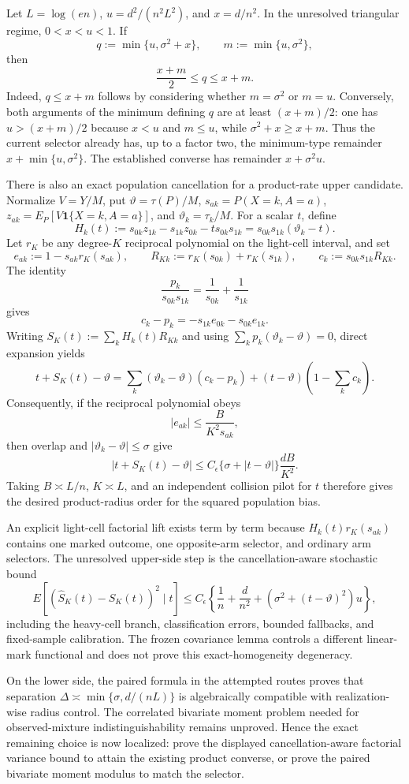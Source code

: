 Let \(L=\log(en)\), \(u=d^2/(n^2L^2)\), and \(x=d/n^2\).  In the unresolved triangular regime, \(0<x<u<1\).  If
\[
 q:=\min\{u,\sigma^2+x\},
 \qquad
 m:=\min\{u,\sigma^2\},
\]
then
\[
 \frac{x+m}{2}\le q\le x+m.
\]
Indeed, \(q\le x+m\) follows by considering whether \(m=\sigma^2\) or \(m=u\).  Conversely, both arguments of the minimum defining \(q\) are at least \((x+m)/2\): one has \(u>(x+m)/2\) because \(x<u\) and \(m\le u\), while \(\sigma^2+x\ge x+m\).  Thus the current selector already has, up to a factor two, the minimum-type remainder \(x+\min\{u,\sigma^2\}\).  The established converse has remainder \(x+\sigma^2u\).

There is also an exact population cancellation for a product-rate upper candidate.  Normalize \(V=Y/M\), put \(\vartheta=\tau(P)/M\), \(s_{ak}=P(X=k,A=a)\), \(z_{ak}=E_P[V\mathbf 1\{X=k,A=a\}]\), and \(\vartheta_k=\tau_k/M\).  For a scalar \(t\), define
\[
 H_k(t):=s_{0k}z_{1k}-s_{1k}z_{0k}-t s_{0k}s_{1k}
 =s_{0k}s_{1k}(\vartheta_k-t).
\]
Let \(r_K\) be any degree-\(K\) reciprocal polynomial on the light-cell interval, and set
\[
 e_{ak}:=1-s_{ak}r_K(s_{ak}),
 \qquad
 R_{Kk}:=r_K(s_{0k})+r_K(s_{1k}),
 \qquad
 c_k:=s_{0k}s_{1k}R_{Kk}.
\]
The identity
\[
 \frac{p_k}{s_{0k}s_{1k}}=\frac1{s_{0k}}+\frac1{s_{1k}}
\]
gives
\[
 c_k-p_k=-s_{1k}e_{0k}-s_{0k}e_{1k}.
\]
Writing \(S_K(t):=\sum_kH_k(t)R_{Kk}\) and using \(\sum_kp_k(\vartheta_k-\vartheta)=0\), direct expansion yields
\[
 t+S_K(t)-\vartheta
 =\sum_k(\vartheta_k-\vartheta)(c_k-p_k)
 +(t-\vartheta)\left(1-\sum_kc_k\right).
\]
Consequently, if the reciprocal polynomial obeys
\[
 |e_{ak}|\le \frac{B}{K^2s_{ak}},
\]
then overlap and \(|\vartheta_k-\vartheta|\le\sigma\) give
\[
 |t+S_K(t)-\vartheta|
 \le C_{\epsilon}\{\sigma+|t-\vartheta|\}\frac{dB}{K^2}.
\]
Taking \(B\asymp L/n\), \(K\asymp L\), and an independent collision pilot for \(t\) therefore gives the desired product-radius order for the squared population bias.

An explicit light-cell factorial lift exists term by term because \(H_k(t)r_K(s_{ak})\) contains one marked outcome, one opposite-arm selector, and ordinary arm selectors.  The unresolved upper-side step is the cancellation-aware stochastic bound
\[
 E\!\left[(\widehat S_K(t)-S_K(t))^2\mid t\right]
 \le C_{\epsilon}\left\{\frac1n+\frac d{n^2}
 +(\sigma^2+(t-\vartheta)^2)u\right\},
\]
including the heavy-cell branch, classification errors, bounded fallbacks, and fixed-sample calibration.  The frozen covariance lemma controls a different linear-mark functional and does not prove this exact-homogeneity degeneracy.

On the lower side, the paired formula in the attempted routes proves that separation \(\Delta\asymp\min\{\sigma,d/(nL)\}\) is algebraically compatible with realization-wise radius control.  The correlated bivariate moment problem needed for observed-mixture indistinguishability remains unproved.  Hence the exact remaining choice is now localized: prove the displayed cancellation-aware factorial variance bound to attain the existing product converse, or prove the paired bivariate moment modulus to match the selector.
